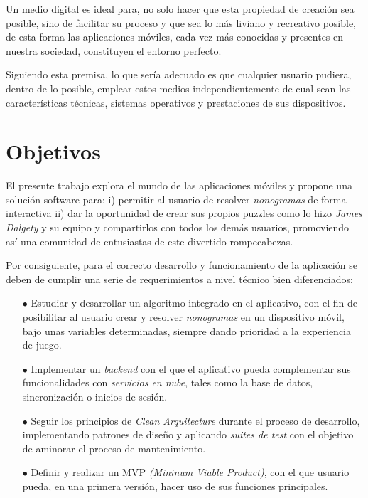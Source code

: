 Un medio digital es ideal para, no solo hacer que esta propiedad de creación sea posible, sino de facilitar su proceso 
y que sea lo más liviano y recreativo posible, de esta forma las aplicaciones móviles, cada vez más conocidas y presentes en nuestra sociedad, constituyen el entorno
perfecto.

Siguiendo esta premisa, lo que sería adecuado es que cualquier usuario pudiera, dentro de lo posible, emplear estos medios
independientemente de cual sean las características técnicas, sistemas operativos y prestaciones de sus dispositivos.

\section{Objetivos}

El presente trabajo explora el mundo de las aplicaciones móviles y propone
una solución software para: i) permitir al usuario de resolver \textit{nonogramas} de forma
interactiva ii) dar la oportunidad de crear sus propios puzzles como lo hizo
\textit{James Dalgety} y su equipo y compartirlos con todos los demás usuarios,
promoviendo así una comunidad de entusiastas de este divertido rompecabezas.

Por consiguiente, para el correcto desarrollo y funcionamiento de la aplicación se deben de
cumplir una serie de requerimientos a nivel técnico bien diferenciados:
\begin{itemize}
   \item[$\bullet$] Estudiar y desarrollar un algoritmo integrado en el aplicativo, con el fin de posibilitar al usuario
   crear y resolver \textit{nonogramas} en un dispositivo móvil, bajo unas variables determinadas, siempre dando prioridad a la experiencia de juego.
   \item[$\bullet$] Implementar un \textit{backend} con el que el aplicativo pueda complementar sus funcionalidades con \textit{servicios en nube},
   tales como la base de datos, sincronización o inicios de sesión.
   \item[$\bullet$] Seguir los principios de \textit{Clean Arquitecture} durante el proceso de desarrollo, implementando patrones de diseño y
   aplicando \textit{suites de test} con el objetivo de aminorar el proceso de mantenimiento.
   \item[$\bullet$] Definir y realizar un MVP \textit{(Mininum Viable Product)}, con el que usuario pueda, en una primera versión,
   hacer uso de sus funciones principales.
\end{itemize}

